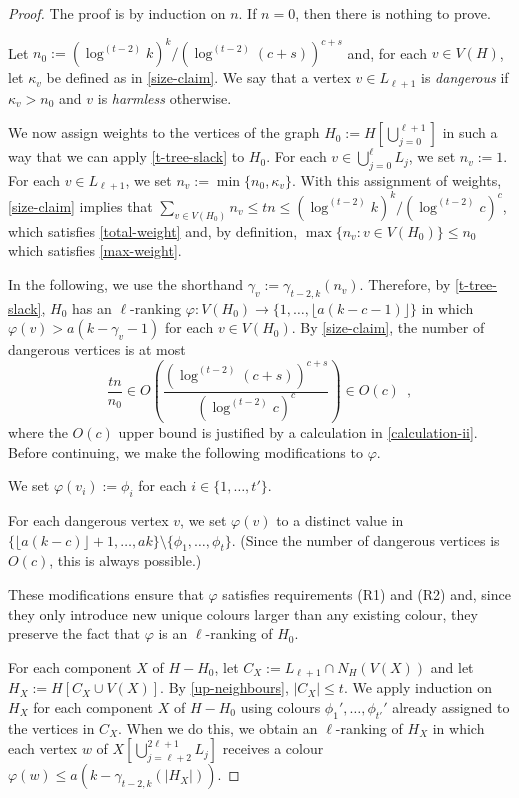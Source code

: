 \documentclass[kpfonts]{patmorin}
\theoremstyle{named}
\begin{document}
\begin{proof}
    The proof is by induction on $n$. If $n=0$, then there is nothing to prove.

    Let $n_0:=(\log^{(t-2)} k)^k/(\log^{(t-2)} (c+s))^{c+s}$ and, for each $v\in V(H)$, let $\kappa_v$ be defined as in \cref{size-claim}.  We say that a vertex $v\in L_{\ell+1}$ is \emph{dangerous} if $\kappa_v>n_0$ and $v$ is \emph{harmless} otherwise.

    We now assign weights to the vertices of the graph $H_0:=H[\bigcup_{j=0}^{\ell+1}]$ in such a way that we can apply \cref{t-tree-slack} to $H_0$.  For each $v\in\bigcup_{j=0}^\ell L_j$, we set $n_v:=1$.  For each $v\in L_{\ell+1}$, we set $n_v := \min\{n_0, \kappa_v\}$.  With this assignment of weights, \cref{size-claim} implies that $\sum_{v\in V(H_0)} n_v\le tn \le (\log^{(t-2)} k)^k/(\log^{(t-2)} c)^c$, which satisfies \cref{total-weight} and, by definition, $\max\{n_v:v\in V(H_0)\}\le n_0$ which satisfies \cref{max-weight}.

    In the following, we use the shorthand $\gamma_v := \gamma_{t-2,k}(n_v)$.    Therefore, by \cref{t-tree-slack}, $H_{0}$ has an $\ell$-ranking $\varphi:V(H_0)\to\{1,\ldots,\lfloor a(k-c-1)\rfloor\}$ in which $\varphi(v)> a(k-\gamma_v-1)$ for each $v\in V(H_0)$.
    By \cref{size-claim}, the number of dangerous vertices is at most
    \[
        \frac{tn}{n_0} \in O\left(\frac{(\log^{(t-2)} (c+s))^{c+s}}{(\log^{(t-2)} c)^c}\right) \in O(c) \enspace ,
    \]
    where the $O(c)$ upper bound is justified by a calculation in \cref{calculation-ii}.
    Before continuing, we make the following modifications to $\varphi$.

    \begin{compactenum}
        \item We set $\varphi(v_i):=\phi_i$ for each $i\in\{1,\ldots,t'\}$.
        \item For each dangerous vertex $v$, we set $\varphi(v)$ to a distinct value in $\{\lfloor a(k-c)\rfloor+1,\ldots,ak\}\setminus\{\phi_1,\ldots,\phi_t\}$. (Since the number of dangerous vertices is $O(c)$, this is always possible.)
    \end{compactenum}
    These modifications ensure that $\varphi$ satisfies requirements (R1) and (R2) and, since they only introduce new unique colours larger than any existing colour, they preserve the fact that $\varphi$ is an $\ell$-ranking of $H_0$.

    For each component $X$ of $H-H_0$, let $C_X:=L_{\ell+1}\cap N_H(V(X))$ and let $H_X:=H[C_X\cup V(X)]$.  By \cref{up-neighbours}, $|C_X|\le t$. We apply induction on $H_X$ for each component $X$ of $H-H_0$ using colours $\phi_1',\ldots,\phi_{t'}'$ already assigned to the vertices in $C_X$.
    When we do this, we obtain an $\ell$-ranking of $H_X$ in which each vertex $w$ of $X[\bigcup_{j=\ell+2}^{2\ell+1} L_j]$ receives a colour $\varphi(w) \le a(k-\gamma_{t-2,k}(|H_X|))$.


\end{proof}
\end{document}

